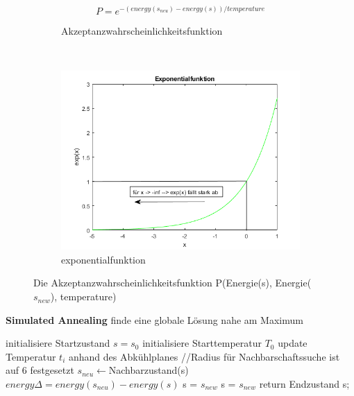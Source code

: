 \begin{figure}[H]
    \centering
    \begin{subfigure}[b]{0.4\textwidth}
        \begin{equation}\label{eq:unsere Energiefunktion}
            P = e^{-(energy(s_{neu}) - energy(s))/ temperature}
        \end{equation}
        \caption{Akzeptanzwahrscheinlichkeitsfunktion}
    \end{subfigure}
    ~ %
    \begin{subfigure}[b]{0.7\textwidth}
        \centering \includegraphics[interpolate=false,width=\linewidth]{content/simulatedAnnealing/Bilder/exponentialfunktion_as_PDF.png}
        \caption{exponentialfunktion}
        \label{fig:Exponentialfunktion}
    \end{subfigure}
    \caption{Die Akzeptanzwahrscheinlichkeitsfunktion P(Energie(s), Energie($s_{new}$), temperature)}
\end{figure}


\begin{algorithm}[H]
    \caption{\textbf{Simulated Annealing} finde eine globale Lösung nahe am Maximum}
    \begin{algorithmic}[1]
        \State initialisiere Startzustand $s=s_{0}$
        \State initialisiere Starttemperatur $T_0$
        \State update Temperatur $t_i$ anhand des Abkühlplanes
        \State //Radius für Nachbarschaftssuche ist auf 6 festgesetzt
        \State $s_{neu}\leftarrow$Nachbarzustand(s)
        \State $energy\Delta = energy(s_{neu}) - energy(s)$
        \State s = $s_{new}$
        \Else{}
        \State s = $s_{new}$
        \EndIf
        \EndIf
        \EndFor
        \State return Endzustand s;
    \end{algorithmic}
    \label{alg:retargeting}
\end{algorithm}


